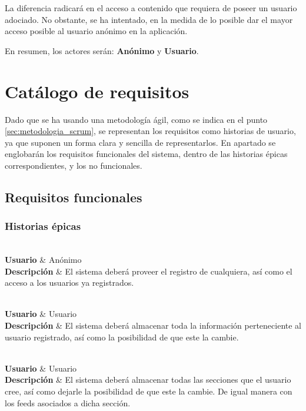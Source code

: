 La diferencia radicará en el acceso a contenido que requiera de poseer un usuario adociado. No obstante, se ha intentado, en la medida de lo posible dar el mayor acceso posible al usuario anónimo en la aplicación.

En resumen, los actores serán: \textbf{Anónimo} y \textbf{Usuario}.

\section{Catálogo de requisitos}\label{sec:catalogo_requisitos}

Dado que se ha usando una metodología ágil, como se indica en el punto \ref{sec:metodologia_scrum}, se representan los requisitos como historias de usuario, ya que suponen un forma clara y sencilla de representarlos. En apartado se englobarán los requisitos funcionales del sistema, dentro de las historias épicas correspondientes, y los no funcionales.

\subsection{Requisitos funcionales}

\subsubsection{Historias épicas}

{
     \\
    \hline
    \textbf{Usuario} & Anónimo  \\
    \textbf{Descripción} & El sistema deberá proveer el registro de cualquiera, así como el acceso a los usuarios ya registrados.  \\
}

{
     \\
    \hline
    \textbf{Usuario} & Usuario  \\
    \textbf{Descripción} & El sistema deberá almacenar toda la información perteneciente al usuario registrado, así como la posibilidad de que este la cambie. \\
}

{
     \\
    \hline
    \textbf{Usuario} & Usuario  \\
    \textbf{Descripción} & El sistema deberá almacenar todas las secciones que el usuario cree, así como dejarle la posibilidad de que este la cambie. De igual manera con los feeds asociados a dicha sección. \\
}


